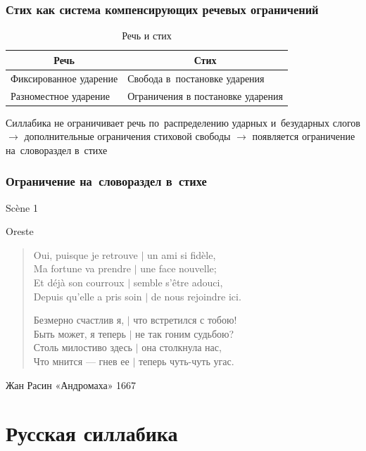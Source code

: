 \documentclass{beamer}
\begin{document}
\begin{frame}
\frametitle{Стих как система компенсирующих 
речевых ограничений}

\begin{table}[]
\centering
\caption{Речь и стих}
\label{my-label}
\begin{tabular}{ll}
\hline
\multicolumn{1}{c}{Речь} & \multicolumn{1}{c}{Стих}          \\ \hline
Фиксированное ударение   & Свобода в~постановке ударения     \\
Разноместное ударение    & Ограничения в постановке ударения
\end{tabular}
\end{table}

Силлабика не ограничивает речь по~распределению ударных и~безударных слогов $\rightarrow$ дополнительные ограничения стиховой свободы $\rightarrow$ появляется ограничение на~словораздел в~стихе

\end{frame}

%
\begin{frame}
\frametitle{Ограничение на~словораздел в~стихе}

\begin{center}
Scène 1
\end{center}
Oreste
\begin{verse}
Oui, puisque je retrouve $\mid$ un ami si fidèle,\\
Ma fortune va prendre $\mid$ une face nouvelle;\\
Et déjà son courroux $\mid$ semble s'être adouci,\\
Depuis qu'elle a pris soin $\mid$ de nous rejoindre ici.

Безмерно счастлив я, $\mid$ что встретился с тобою!\\
Быть может, я теперь $\mid$ не так гоним судьбою?\\
Столь милостиво здесь $\mid$ она столкнула нас,\\
Что мнится — гнев ее $\mid$ теперь чуть-чуть угас.
\end{verse}
Жан Расин «Андромаха» 
1667

\end{frame}


\section{Русская силлабика}\label{sec:rusyl}
\end{document}
